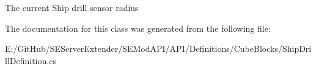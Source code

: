 The current Ship drill sensor radius 



The documentation for this class was generated from the following file\+:\begin{DoxyCompactItemize}
\item 
E\+:/\+Git\+Hub/\+S\+E\+Server\+Extender/\+S\+E\+Mod\+A\+P\+I/\+A\+P\+I/\+Definitions/\+Cube\+Blocks/Ship\+Drill\+Definition.\+cs\end{DoxyCompactItemize}
